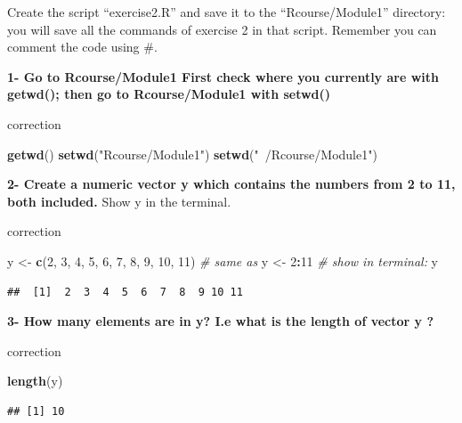 \documentclass[]{book}
\newenvironment{Shaded}{\begin{snugshade}}{\end{snugshade}}
\newcommand{\CommentTok}[1]{\textcolor[rgb]{0.56,0.35,0.01}{\textit{#1}}}
\newcommand{\DecValTok}[1]{\textcolor[rgb]{0.00,0.00,0.81}{#1}}
\newcommand{\KeywordTok}[1]{\textcolor[rgb]{0.13,0.29,0.53}{\textbf{#1}}}
\newcommand{\NormalTok}[1]{#1}
\newcommand{\OperatorTok}[1]{\textcolor[rgb]{0.81,0.36,0.00}{\textbf{#1}}}
\newcommand{\StringTok}[1]{\textcolor[rgb]{0.31,0.60,0.02}{#1}}
\begin{document}
Create the script ``exercise2.R'' and save it to the ``Rcourse/Module1'' directory: you will save all the commands of exercise 2 in that script.
Remember you can comment the code using \#.

\textbf{1- Go to Rcourse/Module1
First check where you currently are with getwd();
then go to Rcourse/Module1 with setwd()}

correction

\begin{Shaded}
\begin{Highlighting}[]
\KeywordTok{getwd}\NormalTok{()}
\KeywordTok{setwd}\NormalTok{(}\StringTok{"Rcourse/Module1"}\NormalTok{)}
\KeywordTok{setwd}\NormalTok{(}\StringTok{"~/Rcourse/Module1"}\NormalTok{)}
\end{Highlighting}
\end{Shaded}

\textbf{2- Create a numeric vector y which contains the numbers from 2 to 11, both included.}
Show y in the terminal.

correction

\begin{Shaded}
\begin{Highlighting}[]
\NormalTok{y <-}\StringTok{ }\KeywordTok{c}\NormalTok{(}\DecValTok{2}\NormalTok{, }\DecValTok{3}\NormalTok{, }\DecValTok{4}\NormalTok{, }\DecValTok{5}\NormalTok{, }\DecValTok{6}\NormalTok{, }\DecValTok{7}\NormalTok{, }\DecValTok{8}\NormalTok{, }\DecValTok{9}\NormalTok{, }\DecValTok{10}\NormalTok{, }\DecValTok{11}\NormalTok{)}
\CommentTok{# same as}
\NormalTok{y <-}\StringTok{ }\DecValTok{2}\OperatorTok{:}\DecValTok{11}
\CommentTok{# show in terminal:}
\NormalTok{y}
\end{Highlighting}
\end{Shaded}

\begin{verbatim}
##  [1]  2  3  4  5  6  7  8  9 10 11
\end{verbatim}

\textbf{3- How many elements are in y? I.e what is the length of vector y ?}

correction

\begin{Shaded}
\begin{Highlighting}[]
\KeywordTok{length}\NormalTok{(y)}
\end{Highlighting}
\end{Shaded}

\begin{verbatim}
## [1] 10
\end{verbatim}
\end{document}
